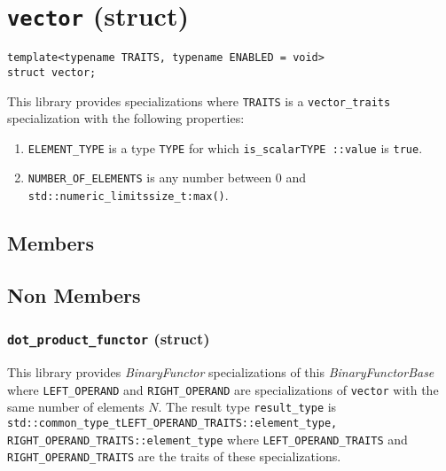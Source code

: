 \documentclass[oneside]{book}
\begin{document}
\section{\texttt{vector} (struct)}
\begin{verbatim}
template<typename TRAITS, typename ENABLED = void>
struct vector;
\end{verbatim}
\noindent{}This library provides specializations where \texttt{TRAITS} is a \texttt{vector\_traits}
specialization with the following properties:
\begin{enumerate}
	\item \texttt{ELEMENT\_TYPE} is a type \texttt{TYPE} for which \texttt{is\_scalar\textlangle TYPE \textrangle::value} is \texttt{true}.
	\item \texttt{NUMBER\_OF\_ELEMENTS} is any number between 0 and \texttt{std::numeric\_limits\textlangle size\_t\textrangle\::max()}.
\end{enumerate}

\subsection{Members}

\subsection{Non Members}
\NewDocumentCommand{}


\NewDocumentCommand{}





\subsubsection{\texttt{dot\_product\_functor} (struct)}
This library provides \textit{BinaryFunctor} specializations of this \textit{BinaryFunctorBase}
where \texttt{LEFT\_OPERAND} and \texttt{RIGHT\_OPERAND} are specializations of \texttt{vector}
with the same number of elements $N$. The result type \texttt{result\_type}          is\newline
\texttt{std::common\_type\_t\textlangle LEFT\_OPERAND\_TRAITS::element\_type, RIGHT\_OPERAND\_TRAITS::element\_type\textrangle}\newline
 where \texttt{LEFT\_OPERAND\_TRAITS} and \texttt{RIGHT\_OPERAND\_TRAITS} are the traits of these specializations.
\end{document}
